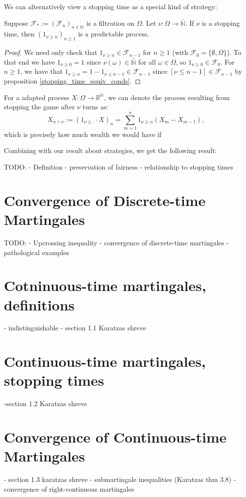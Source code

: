 We can alternatively view a stopping time as a special kind of strategy:

\begin{proposition}
    Suppose $\mathcal{F}_{*} := (\mathcal{F}_{n})_{n \in \mathbb{N}}$ is a filtration on $\Omega$. Let $\nu : \Omega \to \bar{\mathbb{N}}$. If \(\nu\) is a stopping time, then \((1_{\nu \geq n})_{n \geq 1}\) is a predictable process.
\end{proposition}

\begin{proof}
    We need only check that \(1_{\nu \geq n} \in \mathcal{F}_{n-1}\) for \(n \geq 1\) (with \(\mathcal{F}_{0} = \{\emptyset, \Omega\}\)). To that end we have \(1_{\nu \geq 0} = 1\) since \(\nu(\omega) \in \bar{\mathbb{N}}\) for all \(\omega \in \Omega\), so \(1_{\nu \geq 0} \in \mathcal{F}_{0}\). For \(n \geq 1\), we have that \(1_{\nu \geq n} = 1 - 1_{\nu \leq n-1} \in \mathcal{F}_{n-1}\) since \([\nu \leq n-1] \in \mathcal{F}_{n-1}\) by proposition \ref{stopping_time_equiv_conds}.
\end{proof}

For a adapted process $X: \Omega \to \mathbb{R}^{\mathbb{N}}$, we can denote the process resulting from stopping the game after \(\nu\) turns as:
\[X_{n \wedge \nu} := (1_{\nu \geq \cdot} \cdot X)_{n} = \sum\limits_{m=1}^{n} 1_{\nu \geq n} (X_{m} - X_{m-1}),\]
which is precisely how much wealth we would have if 

Combining with our result about strategies, we get the following result:

\begin{corollary}
    
\end{corollary}
TODO:
- Definition
- preservation of fairness
- relationship to stopping times

\section{Convergence of Discrete-time Martingales}

TODO:
- Upcrossing inequality
- convergence of discrete-time martingales
- pathological examples

\section{Cotninuous-time martingales, definitions}
- indistinguishable
- section 1.1 Karatzas shreve

\section{Continuous-time martingales, stopping times}
-section 1.2 Karatzas shreve

\section{Convergence of Continuous-time Martingales}
- section 1.3 karatzas shreve
- submartingale inequalities (Karatzas thm 3.8)
- convergence of right-continuous martingales